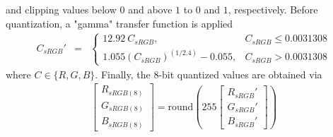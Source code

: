 \documentclass [12pt, a4paper] {article}
\begin{document}
and clipping values below $0$ and above $1$ to $0$ and $1$, respectively.
Before quantization, a "gamma" transfer function is applied
\begin {eqnarray}
    \label{eq:sRGB2}
    C_{sRGB}' &=& 
    \left\{
    \begin {array}{ll}
        12.92\:C_{sRGB}, & C_{sRGB} \leq 0.0031308 \\
        1.055(C_{sRGB})^{(1/2.4)} - 0.055, & C_{sRGB} > 0.0031308
    \end {array}
    \right.
\end {eqnarray}
where $C \in \{R, G, B\}$. Finally, the 8-bit quantized values are obtained via
\begin {eqnarray}
    \begin {bmatrix}
        R_{sRGB(8)} \\
        G_{sRGB(8)} \\
        B_{sRGB(8)}
    \end {bmatrix}
    =
    \textrm{round}
    \left(
        255
        \begin {bmatrix}
            R_{sRGB}' \\
            G_{sRGB}' \\
            B_{sRGB}' 
        \end {bmatrix}
    \right)
\end {eqnarray}


\end{document}
